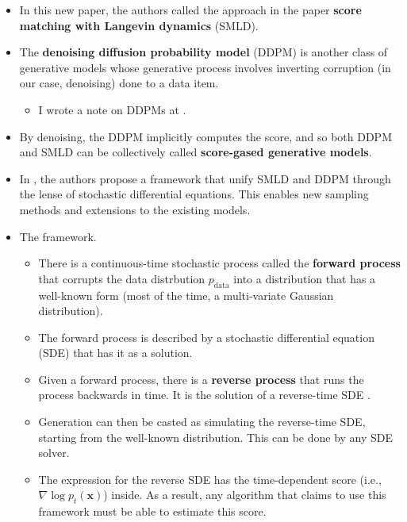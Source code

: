 \documentclass[10pt]{article}
\newcommand{\ve}[1]{\mathbf{#1}}
\newcommand{\mrm}[1]{\mathrm{#1}}
\begin{document}
\begin{itemize}
  \item In this new paper, the authors called the approach in the \cite{Song:2019} paper {\bf score matching with Langevin dynamics} (SMLD).

  \item The {\bf denoising diffusion probability model} (DDPM) \cite{SohlDickstein:2015,Ho:2020} is another class of generative models whose generative process involves inverting corruption (in our case, denoising) done to a data item.
  \begin{itemize}
    \item I wrote a note on DDPMs at \cite{KhungurnDdpm}.
  \end{itemize}
  
  \item By denoising, the DDPM implicitly computes the score, and so both DDPM and SMLD can be collectively called {\bf score-gased generative models}.
  
  \item In \cite{Song:2021}, the authors propose a framework that unify SMLD and DDPM through the lense of stochastic differential equations. This enables new sampling methods and extensions to the existing models.
  
  \item The framework.
  \begin{itemize}
    \item There is a continuous-time stochastic process called the {\bf forward process} that corrupts the data distrbution $p_{\mrm{data}}$ into a distribution that has a well-known form (most of the time, a multi-variate Gaussian distribution).
    
    \item The forward process is described by a stochastic differential equation (SDE) that has it as a solution.
    
    \item Given a forward process, there is a {\bf reverse process} that runs the process backwards in time. It is the solution of a reverse-time SDE \cite{Anderson:1982}.
    
    \item Generation can then be casted as simulating the reverse-time SDE, starting from the well-known distribution. This can be done by any SDE solver.
    
    \item The expression for the reverse SDE has the time-dependent score (i.e., $\nabla \log p_t(\ve{x})$) inside. As a result, any algorithm that claims to use this framework must be able to estimate this score.
  \end{itemize}


\end{itemize}
\end{document}
